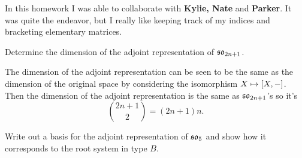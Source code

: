 \documentclass[12pt]{memoir}
\begin{document}
\iffalse
\begin{Ej}[Exercise 1]
    Determine the dimension of the adjoint representation of $\ggl_n$.
\end{Ej}

\begin{ptcbr}
    The dimension of the adjoint representation can be obtained via the isomorphism of vector spaces $X\mapsto\bonj{X,-}$. This means that the dimension of the adjoint representation of $\ggl_n$ is $n^2$.
\end{ptcbr}
\fi

In this homework I was able to collaborate with \textbf{Kylie, Nate} and \textbf{Parker}. It was quite the endeavor, but I really like keeping track of my indices and bracketing elementary matrices.
\begin{Ej}[Exercise 3]
    Determine the dimension of the adjoint representation of $\mathfrak{so}_{2n+1}$.
\end{Ej}

\begin{ptcbr}
    The dimension of the adjoint representation can be seen to be the same as the dimension of the original space by considering the isomorphism $X\mapsto\bonj{X,-}$. Then the dimension of the adjoint representation is the same as $\mathfrak{so}_{2n+1}$'s so it's
    $$\binom{2n+1}{2}=(2n+1)n.$$
\end{ptcbr}

\begin{Ej}[Exercise 4]
    Write out a basis for the adjoint representation of $\mathfrak{so}_5$ and show how it corresponds to the root system in type $B$.
\end{Ej}
\end{document}
